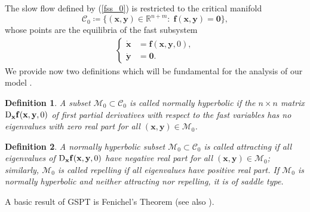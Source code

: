 \documentclass[11pt,reqno]{amsart}
\theoremstyle{boldremark}
\newtheorem{definition}{Definition}
\begin{document}
The slow flow defined by (\ref{fss_0}) is restricted to the critical manifold 
\begin{equation*}
    \mathcal{C}_0 \coloneqq \{(\mathbf{x}, \mathbf{y})\in \mathbb{R}^{n+m} \colon \; \mathbf{f}(\mathbf{x}, \mathbf{y})=\mathbf{0}\}, 
\end{equation*}
whose points are the equilibria of the fast subsystem 
\begin{align*} 
\left\{
\begin{aligned}
    \dot{\mathbf{x}} &= \mathbf{f}(\mathbf{x}, \mathbf{y}, 0), \\ 
    \dot{\mathbf{y}} &= \mathbf{0}.
\end{aligned}
\right.
\end{align*}
We provide now two definitions which will be fundamental for the analysis of our model \cite{40}. 

\begin{definition}
    A subset $\mathcal{M}_0 \subset \mathcal{C}_0$ is called normally hyperbolic if the $n \times n$ matrix $\textnormal{D}_\mathbf{x}\mathbf{f}(\mathbf{x}, \mathbf{y}, 0)$ of first partial derivatives with respect to the fast variables has no eigenvalues with zero real part for all $(\mathbf{x}, \mathbf{y}) \in \mathcal{M}_0$.
\end{definition}

\begin{definition}
    A normally hyperbolic subset $\mathcal{M}_0 \subset \mathcal{C}_0$ is called attracting if all eigenvalues of $\textnormal{D}_\mathbf{x}\mathbf{f}(\mathbf{x}, \mathbf{y}, 0)$ have negative real part for all $(\mathbf{x}, \mathbf{y}) \in \mathcal{M}_0$; similarly, $\mathcal{M}_0$ is called repelling if all eigenvalues have positive real part. If $\mathcal{M}_0$ is normally
    hyperbolic and neither attracting nor repelling, it is of saddle type.
\end{definition}

A basic result of GSPT is Fenichel's Theorem \cite[Theorem 3.1.4]{40} (see also \cite{23}). 
\end{document}
